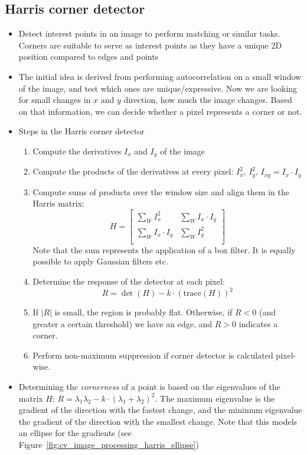 \subsection{Harris corner detector}
\begin{itemize}
	\item Detect interest points in an image to perform matching or similar tasks. Corners are suitable to serve as interest points as they have a unique 2D position compared to edges and points
	\item The initial idea is derived from performing autocorrelation on a small window of the image, and test which ones are unique/expressive. Now we are looking for small changes in $x$ and $y$ direction, how much the image changes. Based on that information, we can decide whether a pixel represents a corner or not.
	\item Steps in the Harris corner detector
	\begin{enumerate}
		\item Compute the derivatives $I_x$ and $I_y$ of the image
		\item Compute the products of the derivatives at every pixel: $I_x^2$, $I_y^2$, $I_{xy}=I_{x}\cdot I_{y}$ 
		\item Compute sums of products over the window size and align them in the Harris matrix:
		$$H = \left[\begin{array}{cc}
		\sum_W I_x^2 & \sum_W I_x \cdot I_y\\
		\sum_W I_x \cdot I_y & \sum_W I_y^2 \\
		\end{array}\right]$$
		Note that the sum represents the application of a box filter. It is equally possible to apply Gaussian filters etc. 
		\item Determine the response of the detector at each pixel:
		$$R = \det(H) - k\cdot \left(\text{trace}(H)\right)^2$$
		\item If $|R|$ is small, the region is probably flat. Otherwise, if $R<0$ (and greater a certain threshold) we have an edge, and $R>0$ indicates a corner.
		\item Perform non-maximum suppression if corner detector is calculated pixel-wise.
	\end{enumerate}
	\item Determining the \textit{cornerness} of a point is based on the eigenvalues of the matrix $H$: $R=\lambda_1 \lambda_2 - k\cdot (\lambda_1 + \lambda_2)^2$. The maximum eigenvalue is the gradient of the direction with the fastest change, and the minimum eigenvalue the gradient of the direction with the smallest change. Note that this models an ellipse for the gradients (see Figure~\ref{fig:cv_image_processing_harris_ellipse})

\end{itemize}
